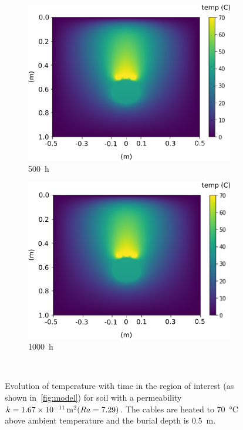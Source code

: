\documentclass[Journal,letterpaper,InsideFigs]{ascelike-new}
\begin{document}
\begin{figure}[ht]
\begin{subfigure}[b]{0.49\textwidth}
    \includegraphics[width=\textwidth]{figs/time-evol/500h.png}
    \caption{\SI{500}{\hour}}
    \label{fig:500}
 \end{subfigure}             
 \begin{subfigure}[b]{0.49\textwidth}
    \includegraphics[width=\textwidth]{figs/time-evol/1000h.png}
    \caption{\SI{1000}{\hour}}
    \label{fig:1000}
 \end{subfigure}  \\
 
 \caption{Evolution of temperature with time in the region of interest (as shown in~\cref{fig:model}) for soil with a permeability $k = \SI{1.67E-11}{\meter\squared} (Ra = 7.29)$. The cables are heated to \SI{70}{\celsius} above ambient temperature and the burial depth is \SI{0.5}{\meter}.}
 \label{fig:time-evol}
\end{figure}
\end{document}
